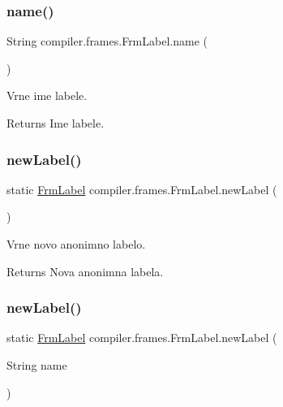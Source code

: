 \subsubsection{\texorpdfstring{name()}{name()}}
{\footnotesize\ttfamily String compiler.\+frames.\+Frm\+Label.\+name (\begin{DoxyParamCaption}{ }\end{DoxyParamCaption})}

Vrne ime labele.

\begin{DoxyReturn}{Returns}
Ime labele. 
\end{DoxyReturn}
\mbox{\label{classcompiler_1_1frames_1_1_frm_label_a6e2d26f9dced44eaa1d47e5234239376}} 
\subsubsection{\texorpdfstring{new\+Label()}{newLabel()}\hspace{0.1cm}{\footnotesize\ttfamily [1/2]}}
{\footnotesize\ttfamily static \hyperlink{classcompiler_1_1frames_1_1_frm_label}{Frm\+Label} compiler.\+frames.\+Frm\+Label.\+new\+Label (\begin{DoxyParamCaption}{ }\end{DoxyParamCaption})\hspace{0.3cm}{\ttfamily [static]}}

Vrne novo anonimno labelo.

\begin{DoxyReturn}{Returns}
Nova anonimna labela. 
\end{DoxyReturn}
\mbox{\label{classcompiler_1_1frames_1_1_frm_label_a4e721e7e5122368f1e1b48f44584ef4f}} 
\subsubsection{\texorpdfstring{new\+Label()}{newLabel()}\hspace{0.1cm}{\footnotesize\ttfamily [2/2]}}
{\footnotesize\ttfamily static \hyperlink{classcompiler_1_1frames_1_1_frm_label}{Frm\+Label} compiler.\+frames.\+Frm\+Label.\+new\+Label (\begin{DoxyParamCaption}\item[{String}]{name }\end{DoxyParamCaption})\hspace{0.3cm}{\ttfamily [static]}}

